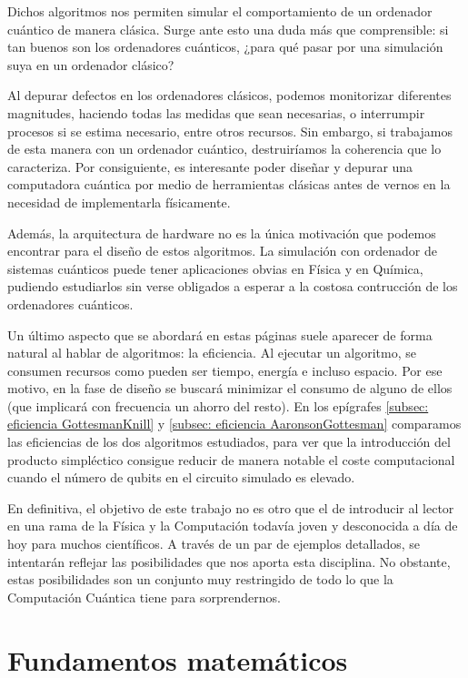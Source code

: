 \documentclass[11pt,a4paper,twoside,pdf]{article}
\numberwithin{equation}{section}
\begin{document}
Dichos algoritmos nos permiten simular el comportamiento de un ordenador cuántico de manera clásica. Surge ante esto una duda más que comprensible: si tan buenos son los ordenadores cuánticos, ¿para qué pasar por una simulación suya en un ordenador clásico?

Al depurar defectos en los ordenadores clásicos, podemos monitorizar diferentes magnitudes, haciendo todas las medidas que sean necesarias, o interrumpir procesos si se estima necesario, entre otros recursos. Sin embargo, si trabajamos de esta manera con un ordenador cuántico, destruiríamos la coherencia que lo caracteriza. Por consiguiente, es interesante poder diseñar y depurar una computadora cuántica por medio de herramientas clásicas antes de vernos en la necesidad de implementarla físicamente.

Además, la arquitectura de hardware no es la única motivación que podemos encontrar para el diseño de estos algoritmos. La simulación con ordenador de sistemas cuánticos puede tener aplicaciones obvias en Física y en Química, pudiendo estudiarlos sin verse obligados a esperar a la costosa contrucción de los ordenadores cuánticos.

Un último aspecto que se abordará en estas páginas suele aparecer de forma natural al hablar de algoritmos: la eficiencia. Al ejecutar un algoritmo, se consumen recursos como pueden ser tiempo, energía e incluso espacio. Por ese motivo, en la fase de diseño se buscará minimizar el consumo de alguno de ellos (que implicará con frecuencia un ahorro del resto).
En los epígrafes \ref{subsec: eficiencia GottesmanKnill} y \ref{subsec: eficiencia AaronsonGottesman} comparamos las eficiencias de los dos algoritmos estudiados, para ver que la introducción del producto simpléctico consigue reducir de manera notable el coste computacional cuando el número de qubits en el circuito simulado es elevado.

En definitiva, el objetivo de este trabajo no es otro que el de introducir al lector en una rama de la Física y la Computación todavía joven y desconocida a día de hoy para muchos científicos. A través de un par de ejemplos detallados, se intentarán reflejar las posibilidades que nos aporta esta disciplina. 
No obstante, estas posibilidades son un conjunto muy restringido de todo lo que la Computación Cuántica tiene para sorprendernos.


\newpage

\section{Fundamentos matemáticos}
	\label{sec: fundamentos matematicos}
	
\end{document}
